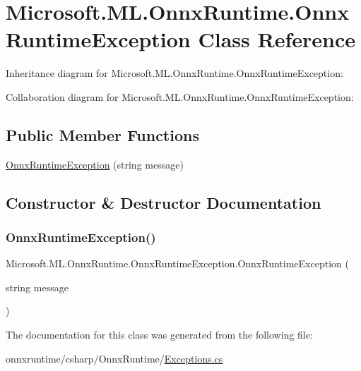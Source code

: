 \hypertarget{classMicrosoft_1_1ML_1_1OnnxRuntime_1_1OnnxRuntimeException}{}\section{Microsoft.\+M\+L.\+Onnx\+Runtime.\+Onnx\+Runtime\+Exception Class Reference}
\label{classMicrosoft_1_1ML_1_1OnnxRuntime_1_1OnnxRuntimeException}


Inheritance diagram for Microsoft.\+M\+L.\+Onnx\+Runtime.\+Onnx\+Runtime\+Exception\+:


Collaboration diagram for Microsoft.\+M\+L.\+Onnx\+Runtime.\+Onnx\+Runtime\+Exception\+:
\subsection*{Public Member Functions}
\begin{DoxyCompactItemize}
\item 
\mbox{\hyperlink{classMicrosoft_1_1ML_1_1OnnxRuntime_1_1OnnxRuntimeException_ae09ce84131105971a01bde8e90445acb}{Onnx\+Runtime\+Exception}} (string message)
\end{DoxyCompactItemize}


\subsection{Constructor \& Destructor Documentation}
\mbox{\label{classMicrosoft_1_1ML_1_1OnnxRuntime_1_1OnnxRuntimeException_ae09ce84131105971a01bde8e90445acb}} 
\subsubsection{\texorpdfstring{Onnx\+Runtime\+Exception()}{OnnxRuntimeException()}}
{\footnotesize\ttfamily Microsoft.\+M\+L.\+Onnx\+Runtime.\+Onnx\+Runtime\+Exception.\+Onnx\+Runtime\+Exception (\begin{DoxyParamCaption}\item[{string}]{message }\end{DoxyParamCaption})\hspace{0.3cm}{\ttfamily [inline]}}



The documentation for this class was generated from the following file\+:\begin{DoxyCompactItemize}
\item 
onnxruntime/csharp/\+Onnx\+Runtime/\mbox{\hyperlink{Exceptions_8cs}{Exceptions.\+cs}}\end{DoxyCompactItemize}

